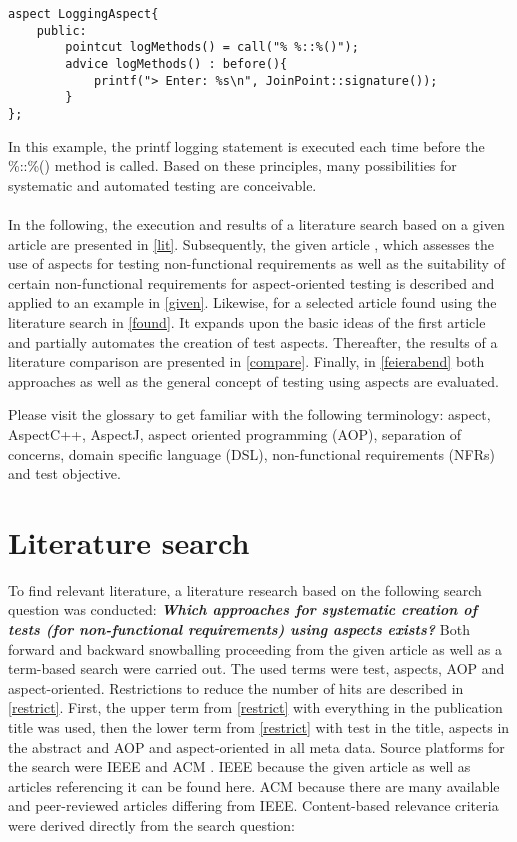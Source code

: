 \lstset {language=C++}
\begin{lstlisting}[caption={Logging Aspect in C++.}, label=logging]
aspect LoggingAspect{
	public:
		pointcut logMethods() = call("% %::%()");
		advice logMethods() : before(){
			printf("> Enter: %s\n", JoinPoint::signature());
		}
};
\end{lstlisting}

\newpage
In this example, the printf logging statement is executed each time before the \%::\%() method is called. Based on these principles, many possibilities for systematic and automated testing are conceivable.\\
\\
In the following, the execution and results of a literature search based on a given article are presented in \autoref{lit}. Subsequently, the given article , which assesses the use of aspects for testing non-functional requirements as well as the suitability of certain non-functional requirements for aspect-oriented testing is described and applied to an example in \autoref{given}. Likewise, for a selected article found using the literature search in \autoref{found}. It expands upon the basic ideas of the first article and partially automates the creation of test aspects. Thereafter, the results of a literature comparison are presented in \autoref{compare}. Finally, in \autoref{feierabend} both approaches as well as the general concept of testing using aspects are evaluated. 

Please visit the glossary to get familiar with the following terminology: aspect, AspectC++, AspectJ, aspect oriented programming (AOP), separation of concerns, domain specific language (DSL), non-functional requirements (NFRs) and test objective.

\section{ Literature search} \label{lit}

To find relevant literature, a literature research based on the following search question was conducted: \textbf{\textit{Which approaches for systematic creation of tests (for non-functional requirements) using aspects exists?}} Both forward and backward snowballing proceeding from the given article as well as a term-based search were carried out. The used terms were test, aspects, AOP and aspect-oriented. Restrictions to reduce the number of hits are described in \autoref{restrict}. First, the upper term from \autoref{restrict} with everything in the publication title was used, then the lower term from \autoref{restrict} with test in the title, aspects in the abstract and AOP and aspect-oriented in all meta data. Source platforms for the search were IEEE \cite{ieee} and ACM \cite{acm}. IEEE because the given article as well as articles referencing it can be found here. ACM because there are many available and peer-reviewed articles differing from IEEE. Content-based relevance criteria were derived directly from the search question:

